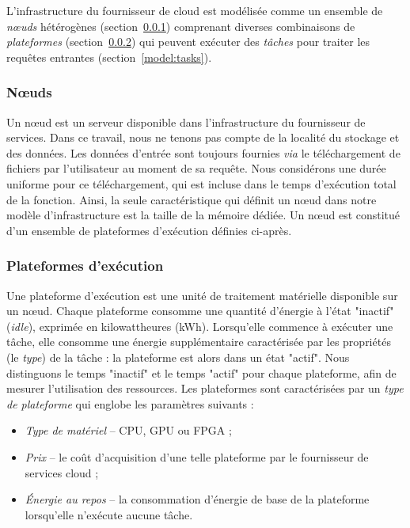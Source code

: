 L'infrastructure du fournisseur de cloud est modélisée comme un ensemble de \textit{nœuds} hétérogènes (section~\ref{model:nodes}) comprenant diverses combinaisons de \textit{plateformes} (section~\ref{model:platforms}) qui peuvent exécuter des \textit{tâches} pour traiter les requêtes entrantes (section~\ref{model:tasks}).

\subsubsection{Nœuds}
\label{model:nodes}

Un nœud est un serveur disponible dans l'infrastructure du fournisseur de services. Dans ce travail, nous ne tenons pas compte de la localité du stockage et des données. Les données d'entrée sont toujours fournies \textit{via} le téléchargement de fichiers par l'utilisateur au moment de sa requête. Nous considérons une durée uniforme pour ce téléchargement, qui est incluse dans le temps d'exécution total de la fonction. Ainsi, la seule caractéristique qui définit un nœud dans notre modèle d'infrastructure est la taille de la mémoire dédiée. Un nœud est constitué d'un ensemble de plateformes d'exécution définies ci-après.

\subsubsection{Plateformes d'exécution}
\label{model:platforms}

Une plateforme d'exécution est une unité de traitement matérielle disponible sur un nœud. Chaque plateforme consomme une quantité d'énergie à l'état "inactif" (\textit{idle}), exprimée en kilowattheures (kWh). Lorsqu'elle commence à exécuter une tâche, elle consomme une énergie supplémentaire caractérisée par les propriétés (le \textit{type}) de la tâche : la plateforme est alors dans un état "actif". Nous distinguons le temps "inactif" et le temps "actif" pour chaque plateforme, afin de mesurer l'utilisation des ressources. Les plateformes sont caractérisées par un \textit{type de plateforme} qui englobe les paramètres suivants :

\begin{itemize}
    \item \textit{Type de matériel} -- \gls{CPU}, \gls{GPU} ou \gls{FPGA} ;
    \item \textit{Prix} -- le coût d'acquisition d'une telle plateforme par le fournisseur de services cloud ;
    \item \textit{Énergie au repos} -- la consommation d'énergie de base de la plateforme lorsqu'elle n'exécute aucune tâche.
\end{itemize}

